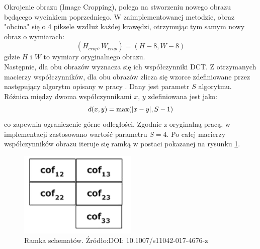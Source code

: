 Okrojenie obrazu (Image Cropping), polega na stworzeniu nowego obrazu będącego wycinkiem poprzedniego. W zaimplementowanej metodzie, obraz "obcina" się o 4 piksele wzdłuż każdej krawędzi, otrzymując tym samym nowy obraz o wymiarach:
\begin{equation}
	(H_{crop}, W_{crop}) = (H - 8, W - 8)
\end{equation}
gdzie $H$ i $W$ to wymiary oryginalnego obrazu.\\

Następnie, dla obu obrazów wyznacza się ich współczynniki DCT. Z otrzymanych macierzy współczynników, dla obu obrazów zlicza się wzorce zdefiniowane przez następujący algorytm opisany w pracy \cite{dct_match_article}. Dany jest parametr $S$ algorytmu. Różnica między dwoma współczynnikami $x$, $y$ zdefiniowana jest jako:
\begin{equation}
	d(x, y) = \max(|x-y|,\space S-1)
\end{equation}
co zapewnia ograniczenie górne odległości. Zgodnie z oryginalną pracą, w implementacji zastosowano wartość parametru $S=4$. Po całej macierzy współczynników obrazu iteruje się ramką w postaci pokazanej na rysunku \ref{fig:pattern_window}.
\begin{figure}[ht!]
	\centering
	\includegraphics[width=0.5\textwidth]{./img/dct_match_pattern_window.png}
	\caption{\label{fig:pattern_window} Ramka schematów. Źródło:DOI: 10.1007/s11042-017-4676-z}
\end{figure}

